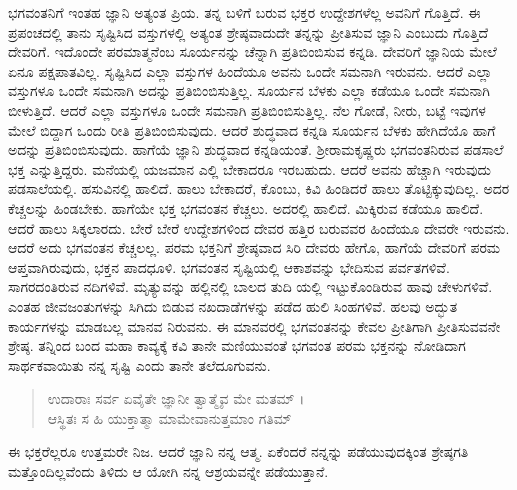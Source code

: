 ಭಗವಂತನಿಗೆ ಇಂತಹ ಜ್ಞಾನಿ ಅತ್ಯಂತ ಪ್ರಿಯ. ತನ್ನ ಬಳಿಗೆ ಬರುವ ಭಕ್ತರ ಉದ್ದೇಶಗಳೆಲ್ಲ ಅವನಿಗೆ ಗೊತ್ತಿದೆ. ಈ ಪ್ರಪಂಚದಲ್ಲಿ ತಾನು ಸೃಷ್ಟಿಸಿದ ವಸ್ತುಗಳಲ್ಲಿ ಅತ್ಯಂತ ಶ್ರೇಷ್ಠವಾದುದೇ ತನ್ನನ್ನು ಪ್ರೀತಿಸುವ ಜ್ಞಾನಿ ಎಂಬುದು ಗೊತ್ತಿದೆ ದೇವರಿಗೆ. ಇದೊಂದೇ ಪರಮಾತ್ಮನೆಂಬ ಸೂರ್ಯನನ್ನು ಚೆನ್ನಾಗಿ ಪ್ರತಿಬಿಂಬಿಸುವ ಕನ್ನಡಿ. ದೇವರಿಗೆ ಜ್ಞಾನಿಯ ಮೇಲೆ ಏನೂ ಪಕ್ಷಪಾತವಿಲ್ಲ. ಸೃಷ್ಟಿಸಿದ ಎಲ್ಲಾ ವಸ್ತುಗಳ ಹಿಂದೆಯೂ ಅವನು ಒಂದೇ ಸಮನಾಗಿ ಇರುವನು. ಆದರೆ ಎಲ್ಲಾ ವಸ್ತುಗಳೂ ಒಂದೇ ಸಮನಾಗಿ ಅದನ್ನು ಪ್ರತಿಬಿಂಬಿಸುತ್ತಿಲ್ಲ. ಸೂರ್ಯನ ಬೆಳಕು ಎಲ್ಲಾ ಕಡೆಯೂ ಒಂದೇ ಸಮನಾಗಿ ಬೀಳುತ್ತಿದೆ. ಆದರೆ ಎಲ್ಲಾ ವಸ್ತುಗಳೂ ಒಂದೇ ಸಮನಾಗಿ ಪ್ರತಿಬಿಂಬಿಸುತ್ತಿಲ್ಲ. ನೆಲ ಗೋಡೆ, ನೀರು, ಬಟ್ಟೆ ಇವುಗಳ ಮೇಲೆ ಬಿದ್ದಾಗ ಒಂದು ರೀತಿ ಪ್ರತಿಬಿಂಬಿಸುವುದು. ಆದರೆ ಶುದ್ಧವಾದ ಕನ್ನಡಿ ಸೂರ್ಯನ ಬೆಳಕು ಹೇಗಿದೆಯೊ ಹಾಗೆ ಅದನ್ನು ಪ್ರತಿಬಿಂಬಿಸುವುದು. ಹಾಗೆಯೆ ಜ್ಞಾನಿ ಶುದ್ಧವಾದ ಕನ್ನಡಿಯಂತೆ. ಶ್ರೀರಾಮಕೃಷ್ಣರು ಭಗವಂತನಿರುವ ಪಡಸಾಲೆ ಭಕ್ತ ಎನ್ನುತ್ತಿದ್ದರು. ಮನೆಯಲ್ಲಿ ಯಜಮಾನ ಎಲ್ಲಿ ಬೇಕಾದರೂ ಇರಬಹುದು. ಆದರೆ ಅವನು ಹೆಚ್ಚಾಗಿ ಇರುವುದು ಪಡಸಾಲೆಯಲ್ಲಿ. ಹಸುವಿನಲ್ಲಿ ಹಾಲಿದೆ. ಹಾಲು ಬೇಕಾದರೆ, ಕೊಂಬು, ಕಿವಿ ಹಿಂಡಿದರೆ ಹಾಲು ತೊಟ್ಟಿಕ್ಕುವುದಿಲ್ಲ. ಅದರ ಕೆಚ್ಚಲನ್ನು ಹಿಂಡಬೇಕು. ಹಾಗೆಯೇ ಭಕ್ತ ಭಗವಂತನ ಕೆಚ್ಚಲು. ಅದರಲ್ಲಿ ಹಾಲಿದೆ. ಮಿಕ್ಕಿರುವ ಕಡೆಯೂ ಹಾಲಿದೆ. ಆದರೆ ಹಾಲು ಸಿಕ್ಕಲಾರದು. ಬೇರೆ ಬೇರೆ ಉದ್ದೇಶಗಳಿಂದ ದೇವರ ಹತ್ತಿರ ಬರುವವರ ಹಿಂದೆಯೂ ದೇವರೇ ಇರುವನು. ಆದರೆ ಅದು ಭಗವಂತನ ಕೆಚ್ಚಲಲ್ಲ. ಪರಮ ಭಕ್ತನಿಗೆ ಶ್ರೇಷ್ಠವಾದ ಸಿರಿ ದೇವರು ಹೇಗೊ, ಹಾಗೆಯೆ ದೇವರಿಗೆ ಪರಮ ಆಪ್ತವಾಗಿರುವುದು, ಭಕ್ತನ ಪಾದಧೂಳಿ. ಭಗವಂತನ ಸೃಷ್ಟಿಯಲ್ಲಿ ಆಕಾಶವನ್ನು ಭೇದಿಸುವ ಪರ್ವತಗಳಿವೆ. ಸಾಗರದಂತಿರುವ ನದಿಗಳಿವೆ. ಮೃತ್ಯುವನ್ನು ಹಲ್ಲಿನಲ್ಲಿ ಬಾಲದ ತುದಿ ಯಲ್ಲಿ ಇಟ್ಟುಕೊಂಡಿರುವ ಹಾವು ಚೇಳುಗಳಿವೆ. ಎಂತಹ ಜೀವಜಂತುಗಳನ್ನು ಸಿಗಿದು ಬಿಡುವ ನಖದಾಡೆಗಳನ್ನು ಪಡೆದ ಹುಲಿ ಸಿಂಹಗಳಿವೆ. ಹಲವು ಅದ್ಭುತ ಕಾರ್ಯಗಳನ್ನು ಮಾಡಬಲ್ಲ ಮಾನವ ನಿರುವನು. ಈ ಮಾನವರಲ್ಲಿ ಭಗವಂತನನ್ನು ಕೇವಲ ಪ್ರೀತಿಗಾಗಿ ಪ್ರೀತಿಸುವವನೇ ಶ್ರೇಷ್ಠ. ತನ್ನಿಂದ ಬಂದ ಮಹಾ ಕಾವ್ಯಕ್ಕೆ ಕವಿ ತಾನೇ ಮಣಿಯುವಂತೆ ಭಗವಂತ ಪರಮ ಭಕ್ತನನ್ನು ನೋಡಿದಾಗ ಸಾರ್ಥಕವಾಯಿತು ನನ್ನ ಸೃಷ್ಟಿ ಎಂದು ತಾನೇ ತಲೆದೂಗುವನು.

\begin{verse}
ಉದಾರಾಃ ಸರ್ವ ಏವೈತೇ ಜ್ಞಾನೀ ತ್ವಾತ್ಮೈವ ಮೇ ಮತಮ್ ।\\ಆಸ್ಥಿತಃ ಸ ಹಿ ಯುಕ್ತಾತ್ಮಾ ಮಾಮೇವಾನುತ್ತಮಾಂ ಗತಿಮ್ 
\end{verse}

{\small ಈ ಭಕ್ತರೆಲ್ಲರೂ ಉತ್ತಮರೇ ನಿಜ. ಆದರೆ ಜ್ಞಾನಿ ನನ್ನ ಆತ್ಮ. ಏಕೆಂದರೆ ನನ್ನನ್ನು ಪಡೆಯುವುದಕ್ಕಿಂತ ಶ್ರೇಷ್ಠಗತಿ ಮತ್ತೊಂದಿಲ್ಲವೆಂದು ತಿಳಿದು ಆ ಯೋಗಿ ನನ್ನ ಆಶ್ರಯವನ್ನೇ ಪಡೆಯುತ್ತಾನೆ.}


